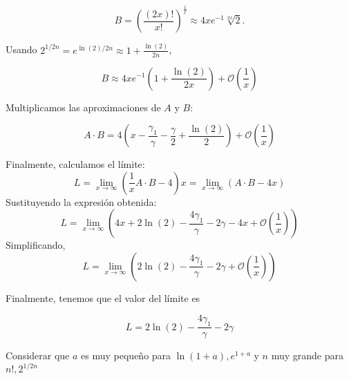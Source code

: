 {\[
	B = \left( \frac{(2x)!}{x!} \right)^{\frac{1}{x}} \approx 4 x e^{-1} \sqrt[2x]{2}.
\]

Usando $2^{1/2n} =e^{\ln(2)/2n}\approx 1 + \frac{\ln(2)}{2n}$,

\[
	B \approx 4 x e^{-1} \left(1 + \frac{\ln(2)}{2x}\right) + \mathcal{O}\left(\frac{1}{x}\right)
\]

Multiplicamos las aproximaciones de $A$ y $B$:

\[
	A \cdot B = 4 \left(x - \frac{\gamma_1}{\gamma} - \frac{\gamma}{2} + \frac{\ln(2)}{2}\right) + \mathcal{O}\left(\frac{1}{x}\right)
\]

Finalmente, calculamos el límite:
\[
	L=\lim_{x \to \infty} \left(\frac{1}{x} A \cdot B - 4 \right)x = \lim_{x \to \infty} \left(A \cdot B - 4x \right)
\]
Sustituyendo la expresión obtenida:
\[
	L=\lim_{x \to \infty} \left(4x + 2 \ln(2) - \frac{4 \gamma_1}{\gamma} - 2 \gamma - 4x + \mathcal{O}\left(\frac{1}{x}\right) \right)
\]
Simplificando,
\[
	L=\lim_{x \to \infty} \left( 2 \ln(2) - \frac{4 \gamma_1}{\gamma} - 2 \gamma +\mathcal{O}\left(\frac{1}{x}\right)\right)
\]
}

Finalmente, tenemos que el valor del límite es
\begin{LnxRptaBox}
	\[
		L=  2\ln(2)- \frac{4 \gamma_1}{\gamma} - 2 \gamma
	\]
\end{LnxRptaBox}

\vspace{1.4cm}
{\large   * Considerar que $a$ es muy pequeño para $\ln(1+a), e^{1+a}$ y $n$ muy grande para $ n!, 2^{1/2n}$}
